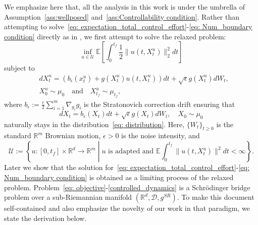 \documentclass{amsart}
\numberwithin{equation}{section}
\newcommand{\R}{\mathbb{R}}
\newcommand{\map}[3]{#1:#2 \rightarrow #3}
\newcommand{\E}{\mathbb{E}}
\begin{document}
We emphasize here that, all the analysis in this work is under the umbrella of Assumption~\ref{ass:wellposed} and~\ref{ass:Controllability condition}. 
Rather than attempting to solve~\eqref{eq: expectation_total_control_effort}-\eqref{eq: Num_boundary condition} directly as in \cite{agrachev2009optimal,figalli2010mass,elamvazhuthi2024benamou}, we first attempt to solve the relaxed problem: %
\begin{equation}\label{eq: objective}
\inf_{u \in \mathcal{U}} \E \left[ \int_0^{t_f} \frac12 \|u(t,  X_t^u)\|_2^2  dt  \right]
\end{equation}
subject to 
\begin{align}\label{controlled_dynamics}
&d X_t^u = (b_{\epsilon}(x_t^u) + g(X_t^u) u(t,  X_t^u))  dt+ \sqrt{\epsilon} g(X_t^u)  dW_t,\\
& X_0^u\sim\mu_0\quad\text{and}\quad  X_{t_f}^u\sim\mu_{t_f},\nonumber
\end{align}
where $b_{\epsilon} :=\frac\epsilon2\sum_{i=1}^{m}\nabla_{g_i}g_i$ %
is the Stratonovich correction drift ensuring that %
\begin{equation}\label{uncontrolled_dynamic_constraint}
dX_t = b_{\epsilon}(X_t) dt + \sqrt\epsilon g(X_t) dW_t, \quad  X_0 \sim \mu_0
\end{equation}
naturally stays in the distribution~\eqref{eq: distribution}. %
Here, $\{W_t\}_{t \ge 0}$ is the standard $\mathbb{R}^m$ Brownian motion,  
$\epsilon>0$ is the noise intensity, and
\[
\mathcal{U} := \left\{ \map{u}{[0, t_f] \times \mathbb{R}^d}{\mathbb{R}^m} \middle| \text{$u$ is adapted and } \mathbb{E} \int_0^{t_f} \|u(t,  X_t^u)\|^2 dt < \infty \right\}.
\]
Later we show that the solution for~\eqref{eq: expectation_total_control_effort}-\eqref{eq: Num_boundary condition} is obtained as a limiting process of the relaxed problem. Problem~\eqref{eq: objective}-\eqref{controlled_dynamics} is a Schr\"odinger bridge problem over a sub-Riemannian manifold $(\R^d,\mathcal{D},g^{SR})$. To make this document self-contained and also emphasize the novelty of our work in that paradigm, we state the derivation below.
\end{document}
